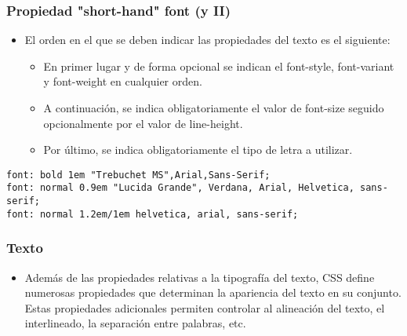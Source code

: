 \begin{frame}[fragile]
\frametitle{Propiedad "short-hand" font (y II)}

\begin{itemize}
  \item El orden en el que se deben indicar las propiedades del texto es el siguiente:
  \begin{itemize}
    \item En primer lugar y de forma opcional se indican el font-style, font-variant y font-weight en cualquier orden.
    \item A continuación, se indica obligatoriamente el valor de font-size seguido opcionalmente por el valor de line-height.
    \item Por último, se indica obligatoriamente el tipo de letra a utilizar.
  \end{itemize}
\end{itemize}

\begin{footnotesize}
\begin{verbatim}
font: bold 1em "Trebuchet MS",Arial,Sans-Serif;
font: normal 0.9em "Lucida Grande", Verdana, Arial, Helvetica, sans-serif;
font: normal 1.2em/1em helvetica, arial, sans-serif;
\end{verbatim}
\end{footnotesize}

\end{frame}



\begin{frame}
\frametitle{Texto}

\begin{itemize}
  \item Además de las propiedades relativas a la tipografía del texto, CSS define numerosas propiedades que determinan la apariencia del texto en su conjunto. Estas propiedades adicionales permiten controlar al alineación del texto, el interlineado, la separación entre palabras, etc.
\end{itemize}

\end{frame}



